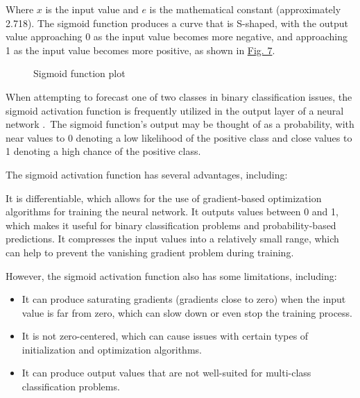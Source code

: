 \documentclass[a4paper]{article}
\begin{document}
Where $x$ is the input value and $e$ is the mathematical constant (approximately 2.718). The sigmoid function produces a curve that is S-shaped, with the output value approaching 0 as the input value becomes more negative, and approaching 1 as the input value becomes more positive, as shown in \hyperref[fig:sigmoid]{Fig. 7}.

\begin{center}
\begin{figure}[!h]
\centering
{}
\caption{Sigmoid function plot}
\label{fig:sigmoid}
\end{figure}
\end{center}

When attempting to forecast one of two classes in binary classification issues, the sigmoid activation function is frequently utilized in the output layer of a neural network . The sigmoid function's output may be thought of as a probability, with near values to 0 denoting a low likelihood of the positive class and close values to 1 denoting a high chance of the positive class.

The sigmoid activation function has several advantages, including:

It is differentiable, which allows for the use of gradient-based optimization algorithms for training the neural network.
It outputs values between 0 and 1, which makes it useful for binary classification problems and probability-based predictions.
It compresses the input values into a relatively small range, which can help to prevent the vanishing gradient problem during training.

However, the sigmoid activation function also has some limitations, including:

\begin{itemize}[leftmargin=7.5pt]
    \item It can produce saturating gradients (gradients close to zero) when the input value is far from zero, which can slow down or even stop the training process.
    \item It is not zero-centered, which can cause issues with certain types of initialization and optimization algorithms.
    \item It can produce output values that are not well-suited for multi-class classification problems.
\end{itemize}
\end{document}
